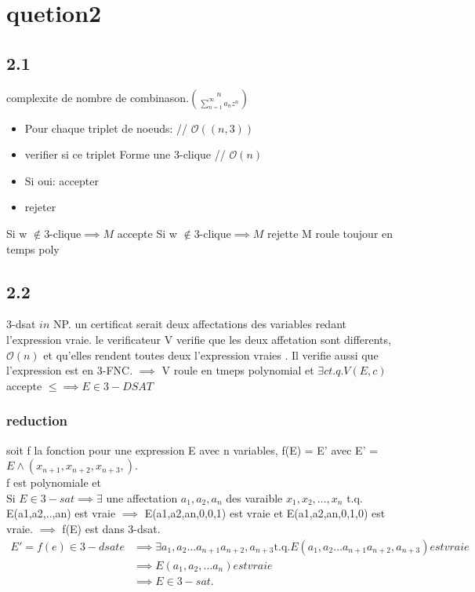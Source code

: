 \documentclass[a4paper]{article}
\begin{document}
\section*{quetion2}
\subsection*{2.1}
complexite de nombre de combinason.$ n \choose \sum_{n=1}^{\infty} a_n z^n$
\begin{itemize}
	\item[] Pour chaque triplet de noeuds: // $\mathcal{O} \left ( (n,3) \right ) $
	\item[]\qquad verifier si ce triplet Forme une 3-clique // $\mathcal{O} \left ( n \right ) $ 
	\item[]\qquad Si oui: accepter
	\item[]rejeter
\end{itemize}
Si w $\notin \text{3-clique} \implies M $ accepte
Si w $\notin \text{3-clique} \implies M $ rejette
M roule toujour en temps poly
\subsection*{2.2}
3-dsat $in$ NP. un certificat serait deux affectations des variables redant l'expression vraie. le verificateur V verifie que les deux affetation sont differents, $\mathcal{O} \left ( n \right ) $ et qu'elles rendent toutes deux l'expression vraies . Il verifie aussi que l'expression est en 3-FNC. $\implies$ V roule en tmeps polynomial et $\exists c t.q. V\left( E,c \right) $ accepte $\le\implies E \in 3-DSAT$

\subsubsection*{reduction}
soit f la fonction pour une expression E avec n variables, f(E) = E' avec E' = $E \wedge \left( x_{n+1},x_{n+2},x_{n+3}, \right) $.\\
f est polynomiale et \\

Si $E \in 3-sat \implies \exists $ une affectation $a_1,a_2,a_n$ des varaible $x_1,x_2,\ldots,x_{n}$ t.q. E(a1,a2,..,an) est vraie $\implies$ E(a1,a2,an,0,0,1) est vraie et E(a1,a2,an,0,1,0) est vraie. $\implies$ f(E) est dans 3-dsat.\\

\begin{align*}
	E'= f(e) \in  3-dsate &\implies \exists a_1, a_2\ldots a_{n+1} a_{n+2}, a_{n+3} \text{t.q.} E\left( a_1, a_2\ldots a_{n+1} a_{n+2}, a_{n+3} \right)   est vraie\\
			      &\implies E(a_1,a_2,\ldots a_{n}) est vraie\\
			      &\implies E \in 3-sat
.\end{align*}
\end{document}
